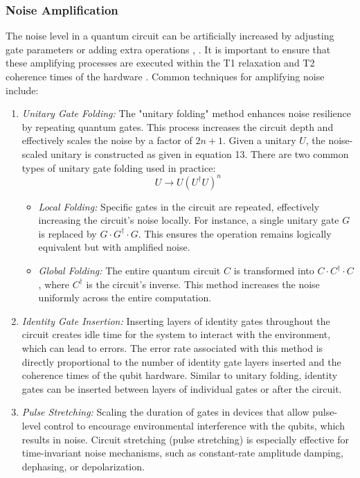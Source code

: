 \documentclass[12pt]{article}
\begin{document}
\subsubsection{Noise Amplification}
The noise level in a quantum circuit can be artificially increased by adjusting gate parameters or adding extra operations \cite{Giurgica_Tiron_2020}, \cite{majumdar2023bestpracticesquantumerror}. It is important to ensure that these amplifying processes are executed within the T1 relaxation and T2 coherence times of the hardware \cite{kandala2019error}. Common techniques for amplifying noise include:
    \begin{enumerate}
        \item \textit{Unitary Gate Folding:} The "unitary folding" method enhances noise resilience by repeating quantum gates. This process increases the circuit depth and effectively scales the noise by a factor of \(2n + 1\). Given a unitary \(U\), the noise-scaled unitary is constructed as given in equation 13. There are two common types of unitary gate folding used in practice:
        \begin{equation}
        U \to U (U^\dagger U)^n
        \end{equation}

        \begin{itemize}
        \item \textit{Local Folding:} Specific gates in the circuit are repeated, effectively increasing the circuit's noise locally. For instance, a single unitary gate $G$ is replaced by $G \cdot G^\dagger \cdot G$. This ensures the operation remains logically equivalent but with amplified noise.
        
        \item \textit{Global Folding:} The entire quantum circuit $C$ is transformed into $C \cdot C^\dagger \cdot C$, where $C^\dagger$ is the circuit's inverse. This method increases the noise uniformly across the entire computation.
        \end{itemize}
                      
        \item \textit{Identity Gate Insertion:} Inserting layers of identity gates throughout the circuit creates idle time for the system to interact with the environment, which can lead to errors. The error rate associated with this method is directly proportional to the number of identity gate layers inserted and the coherence times of the qubit hardware. Similar to unitary folding, identity gates can be inserted between layers of individual gates or after the circuit.

    \item \textit{Pulse Stretching:} Scaling the duration of gates in devices that allow pulse-level control to encourage environmental interference with the qubits, which results in noise. Circuit stretching (pulse stretching) is especially effective for time-invariant noise mechanisms, such as constant-rate amplitude damping, dephasing, or depolarization.
    \end{enumerate}
\end{document}

